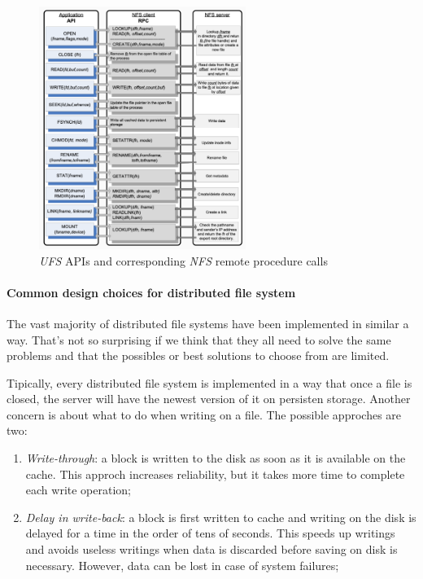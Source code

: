 \begin{figure}[h!]
    \centering
    \includegraphics[width=0.6\textwidth]{images/nfs-remote-calls.png}
    \caption{\emph{UFS} APIs and corresponding \emph{NFS} remote procedure calls}
\end{figure}

\paragraph{Common design choices for distributed file system}
The vast majority of distributed file systems have been implemented in similar
a way. That's not so surprising if we think that they all need to solve the same
problems and that the possibles or best solutions to choose from are limited.

Tipically, every distributed file system is implemented in a way that once a file
is closed, the server will have the newest version of it on persisten storage.
Another concern is about what to do when writing on a file. The possible
approches are two:
\begin{enumerate}
    \item \emph{Write-through}: a block is written to the disk as soon as it is
    available on the cache. This approch increases reliability, but it takes more
    time to complete each write operation;
    \item \emph{Delay in write-back}: a block is first written to cache and
    writing on the disk is delayed for a time in the order of tens of seconds.
    This speeds up writings and avoids useless writings when data is discarded
    before saving on disk is necessary. However, data can be lost in case
    of system failures;
\end{enumerate}

